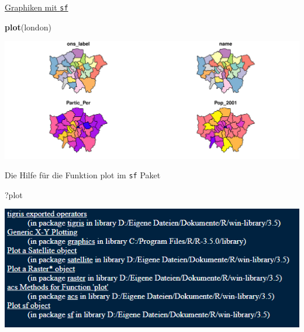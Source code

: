 \documentclass[ignorenonframetext,]{beamer}
\newenvironment{Shaded}{\begin{snugshade}}{\end{snugshade}}
\newcommand{\KeywordTok}[1]{\textcolor[rgb]{0.26,0.66,0.93}{\textbf{#1}}}
\newcommand{\NormalTok}[1]{\textcolor[rgb]{0.74,0.68,0.62}{#1}}
\begin{document}
\begin{frame}[fragile]{\href{https://r-spatial.github.io/sf/articles/sf5.html}{Graphiken
mit \texttt{sf}}}
\protect\hypertarget{graphiken-mit-sf}{}

\begin{Shaded}
\begin{Highlighting}[]
\KeywordTok{plot}\NormalTok{(london)}
\end{Highlighting}
\end{Shaded}

\includegraphics{B7_simplefeatures_files/figure-beamer/unnamed-chunk-7-1.pdf}

\end{frame}

\begin{frame}[fragile]{Die Hilfe für die Funktion plot im \texttt{sf}
Paket}
\protect\hypertarget{die-hilfe-fur-die-funktion-plot-im-sf-paket}{}

\begin{Shaded}
\begin{Highlighting}[]
\NormalTok{?plot}
\end{Highlighting}
\end{Shaded}

\includegraphics{figure/fragezeichen_plot.PNG}

\end{frame}
\end{document}
